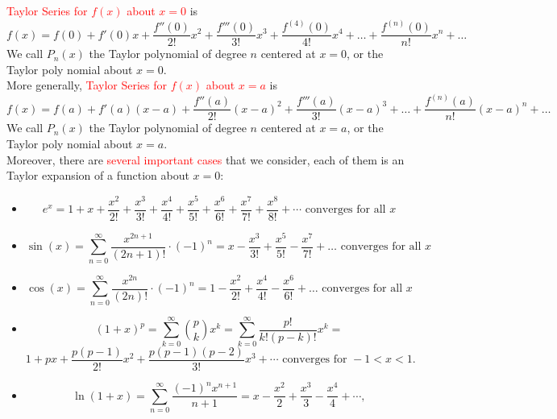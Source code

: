 \documentclass[12pt]{article}
\theoremstyle{definition}
\theoremstyle{definition}
\theoremstyle{remark}
\theoremstyle{definition}
\theoremstyle{definition}
\theoremstyle{definition}
\begin{document}
\textcolor{red}{Taylor Series for $f(x)$ about $x=0$} is \[f(x) = f(0) + f'(0)x + \frac{f''(0)}{2!}x^2 + \frac{f'''(0)}{3!}x^3 + \frac{f^{(4)}(0)}{4!} x^4 + \ldots + \frac{f^{(n)}(0)}{n!} x^n+ \ldots \]
We call $P_n(x)$ the Taylor polynomial of degree $n$ centered at $x = 0$, or the Taylor poly
nomial about $x = 0$.\\

More generally, \textcolor{red}{Taylor Series for $f(x)$ about $x=a$} is \[f(x) = f(a) + f'(a)(x-a) + \frac{f''(a)}{2!}(x-a)^2 + \frac{f'''(a)}{3!}(x-a)^3  + \ldots + \frac{f^{(n)}(a)}{n!} (x-a)^n+ \ldots \]
We call $P_n(x)$ the Taylor polynomial of degree $n$ centered at $x = a$, or the Taylor poly
nomial about $x =a$.\\


Moreover, there are \textcolor{red}{several important cases} that we consider, each of them is an Taylor expansion of a function about $x=0$:
\begin{itemize}
\item \[e^{x}= 1 + x + \frac{x^2}{2!} + \frac{x^3}{3!} + \frac{x^4}{4!} + \frac{x^5}{5!} + \frac{x^6}{6!} + \frac{x^7}{7!} + \frac{x^8}{8!} + \cdots\text{ converges for all } x\]
\item \[\sin(x)=\sum\limits_{n=0}^\infty \dfrac{x^{2n+1}}{(2n+1)!}\cdot(-1)^n = x-\dfrac{x^3}{3!}+\dfrac{x^5}{5!}-\dfrac{x^7}{7!}+\dots\text{ converges for all } x\]
\item \[\cos(x)=\sum\limits_{n=0}^\infty \dfrac{x^{2n}}{(2n)!}\cdot(-1)^n = 1-\frac{x^2}{2!}+\frac{x^4}{4!}-\frac{x^6}{6!}+\dots \text{ converges for all } x\]
\item \[(1 + x)^p = \sum_{k=0}^{\infty} \binom{p}{k} x^k= \sum_{k=0}^{\infty} \frac{p!}{k!(p-k)!} x^k=\]\[1 + px + \frac{p(p - 1)}{2!}x^2 + \frac{p(p - 1)(p - 2)}{3!}x^3 + \cdots \text{ converges for } -1 < x < 1.\]
\item \[\ln(1+x) =\sum_{n = 0}^{\infty}\frac{(-1)^nx^{n+1}}{n+1}= x-\frac{x^2}{2}+\frac{x^3}{3}-\frac{x^4}{4}+\cdots,\]

\end{itemize}
\end{document}
